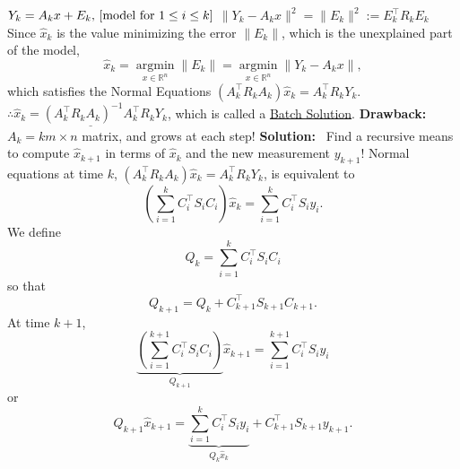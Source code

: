 \documentclass[letterpaper]{article}
\newcommand{\real}{\mathbb R}  %
\begin{document}
    \newline\newline
    $ Y_k=A_kx+E_k\textnormal{, } [\textnormal{model for } 1 \leq i \leq k ]$
    \newline
    $\|Y_k-A_kx\|^2=\|E_k\|^2:=E_k^\top R_kE_k$
    \newline\newline
    Since $\hat{x}_k$ is the value minimizing the error $\|E_k\|$, which is the unexplained part of the model,
    \begin{equation*}
        \hat{x}_k=\underset{x \in \real^n}{\operatorname{argmin}}\| E_k \|=\underset{x \in \real^n}{\operatorname{argmin}}\| Y_k-A_kx \|,
    \end{equation*}
    which satisfies the Normal Equations $ (A_k^\top R_kA_k)\hat{x}_k=A_k^\top R_kY_k $.
    \newline\newline
    $ \therefore \underline{\hat{x}_k=(A_k^\top R_kA_k)^{-1}A_k^\top R_kY_k} $, which is called a \underline{Batch Solution}.
    \newline\newline
    \textbf{Drawback:}~ $A_k=km \times n$ matrix, and grows at each step!
    \newline\newline
    \textbf{Solution:}~ Find a recursive means to compute $\hat{x}_{k+1}$ in terms of $\hat{x}_k$ and the new measurement $y_{k+1}$!
    \newline\newline
    Normal equations at time $k$, $ (A_k^\top R_kA_k)\hat{x}_k=A_k^\top R_kY_k $, is equivalent to
    $$\left(\sum\limits_{i=1}^k C_i^\top S_iC_i\right)\hat{x}_k=\sum\limits_{i=1}^k C_i^\top S_iy_i.$$
    \newline\newline
    We define
    \begin{equation*}
        Q_k=\sum\limits_{i=1}^k C_i^\top S_iC_i
    \end{equation*}
    so that
    \begin{equation*}
        Q_{k+1} = Q_k+C_{k+1}^\top S_{k+1}C_{k+1}.
    \end{equation*}
    At time $k+1$,
    \begin{equation*}
        \underbrace{(\sum\limits_{i=1}^{k+1} C_i^\top S_iC_i)}_{Q_{k+1}}\hat{x}_{k+1}=\sum\limits_{i=1}^{k+1} C_i^\top S_iy_i
    \end{equation*}
    \newline
    or
    \begin{equation*}
        Q_{k+1}\hat{x}_{k+1}=\underbrace{\sum\limits_{i=1}^k C_i^\top S_iy_i}_{Q_k\hat{x}_k}+C_{k+1}^\top S_{k+1}y_{k+1}.
    \end{equation*}
\end{document}
